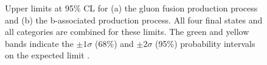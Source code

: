 \begin{figure}[h!]
\begin{center}
\end{center}
\caption[Upper limits at 95\% CL for the gluon fusion and b-associated production process.]{Upper limits at 95\% \ac{CL} for (a) the gluon fusion production
process and (b) the b-associated production process. All four final states and 
all categories are combined for these limits. The green and yellow bands indicate
the $\pm 1\sigma$ (68\%) and $\pm 2\sigma$ (95\%) probability intervals on the expected limit \cite{CMS-PAS-HIG-16-006}.}
\label{fig:mssm_results_hig16006_limits}
\end{figure}

